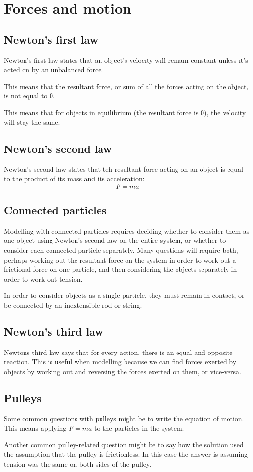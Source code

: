 \section{Forces and motion}
\subsection{Newton's first law}
Newton's first law states that an object's velocity will remain constant unless it's acted on by an unbalanced force.

This means that the resultant force, or sum of all the forces acting on the object, is not equal to 0.

This means that for objects in equilibrium (the resultant force is 0), the velocity will stay the same.
\subsection{Newton's second law}
Newton's second law states that teh resultant force acting on an object is equal to the product of its mass and its acceleration:
\begin{equation}
	F=ma
\end{equation}

\subsection{Connected particles}
Modelling with connected particles requires deciding whether to consider them as one object using Newton's second law on the entire system, or whether to consider each connected particle separately. Many questions will require both, perhaps working out the resultant force on the system in order to work out a frictional force on one particle, and then considering the objects separately in order to work out tension.

In order to consider objects as a single particle, they must remain in contact, or be connected by an inextensible rod or string.

\subsection{Newton's third law}
Newtons third law says that for every action, there is an equal and opposite reaction. This is useful when modelling because we can find forces exerted by objects by working out and reversing the forces exerted on them, or vice-versa.

\subsection{Pulleys}
Some common questions with pulleys might be to write the equation of motion. This means applying $F=ma$ to the particles in the system.

Another common pulley-related question might be to say how the solution used the assumption that the pulley is frictionless. In this case the answer is assuming tension was the same on both sides of the pulley.
